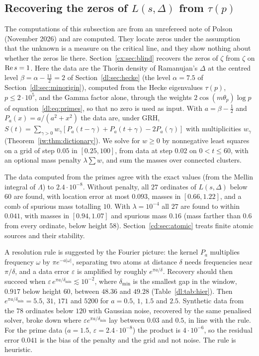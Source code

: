 \subsection{Recovering the zeros of $L(s,\Delta)$ from $\tau(p)$}\label{cx:sec:tau}

The computations of this subsection are from an unrefereed note of Polson (November 2026) and are computed. They locate zeros under the assumption that the unknown is a measure on the critical line, and they show nothing about whether the zeros lie there. Section~\ref{cx:sec:blind} recovers the zeros of $\zeta$ from $\zeta$ on $\operatorname{Re} s=1$. Here the data are the Thorin density of Ramanujan's $\Delta$ at the centred level $\beta=\alpha-\frac{11}2=2$ of Section~\ref{dl:sec:hecke} (the level $\alpha=7.5$ of Section~\ref{dl:sec:minorigin}), computed from the Hecke eigenvalues $\tau(p)$, $p\le2\cdot10^5$, and the Gamma factor alone, through the weights $2\cos(m\theta_p)\log p$ of equation~\eqref{dl:eq:primes}, so that no zero is used as input. With $a=\beta-\frac12$ and $P_a(x)=a/(a^2+x^2)$ the data are, under GRH, $S(t)=\sum_{\gamma>0}w_\gamma[P_a(t-\gamma)+P_a(t+\gamma)-2P_a(\gamma)]$ with multiplicities $w_\gamma$ (Theorem~\ref{iw:thm:dictionary}). We solve for $w\ge0$ by nonnegative least squares on a grid of step $0.05$ in $[0.25,100]$, from data at step $0.02$ on $0<t\le60$, with an optional mass penalty $\lambda\sum w$, and sum the masses over connected clusters.

The data computed from the primes agree with the exact values (from the Mellin integral of $\Lambda$) to $2.4\cdot10^{-8}$. Without penalty, all $27$ ordinates of $L(s,\Delta)$ below $60$ are found, with location error at most $0.093$, masses in $[0.66,1.22]$, and a comb of spurious mass totalling $10$. With $\lambda=10^{-4}$ all $27$ are found to within $0.041$, with masses in $[0.94,1.07]$ and spurious mass $0.16$ (mass farther than $0.6$ from every ordinate, below height $58$). Section~\ref{cd:sec:atomic} treats finite atomic sources and their stability.

A resolution rule is suggested by the Fourier picture: the kernel $P_a$ multiplies frequency $\omega$ by $\pi e^{-a|\omega|}$, separating two atoms at distance $\delta$ needs frequencies near $\pi/\delta$, and a data error $\varepsilon$ is amplified by roughly $e^{\pi a/\delta}$. Recovery should then succeed when $\varepsilon\,e^{\pi a/\delta_{\min}}\lesssim10^{-2}$, where $\delta_{\min}$ is the smallest gap in the window, $0.917$ below height $60$, between $48.36$ and $49.28$ (Table~\ref{dl:tab:hier}). Then $e^{\pi a/\delta_{\min}}=5.5$, $31$, $171$ and $5200$ for $a=0.5$, $1$, $1.5$ and $2.5$. Synthetic data from the $78$ ordinates below $120$ with Gaussian noise, recovered by the same penalised solver, broke down where $\varepsilon e^{\pi a/\delta_{\min}}$ lay between $0.03$ and $0.5$, in line with the rule. For the prime data ($a=1.5$, $\varepsilon=2.4\cdot10^{-8}$) the product is $4\cdot10^{-6}$, so the residual error $0.041$ is the bias of the penalty and the grid and not noise. The rule is heuristic.

